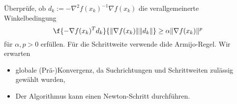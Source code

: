 Überprüfe, ob $d_k := -\nabla^2 f(x_k)^{-1} \nabla f(x_k)$ die verallgemeinerte Winkelbedingung
\[
	\f{-\nabla f(x_k)^T d_k}{\|\nabla f(x_k)\| \|d_k\|} \ge \alpha \|\nabla f(x_k)\|^p
\]
für $\alpha, p > 0$ erfüllen.
Für die Schrittweite verwende dide Armijo-Regel.
Wir erwarten
\begin{itemize}
	\item
		globale (Prä-)Konvergenz, da Suchrichtungen und Schrittweiten zulässig gewählt wurden,
	\item
		Der Algorithmus kann einen Newton-Schritt durchführen.
\end{itemize}

\begin{alg} \label{alg:8}
	\begin{algorithmic}
				\EndIf
			\Else
			\EndIf
			\Repeat
		\EndWhile
	\end{algorithmic}
\end{alg}

